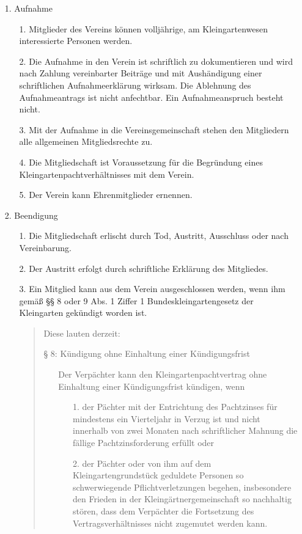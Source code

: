 \documentclass{scrartcl}
\begin{document}
\begin{itemize}
	\item[1.] Aufnahme
		\begin{itemize}
		\item[1.] Mitglieder des Vereins können volljährige, am Kleingartenwesen
		          interessierte Personen werden.
		\item[2.] Die Aufnahme in den Verein ist schriftlich zu dokumentieren und wird
				  nach Zahlung vereinbarter Beiträge und mit Aushändigung einer
				  schriftlichen Aufnahmeerklärung wirksam. Die Ablehnung des
				  Aufnahmeantrags ist nicht anfechtbar. Ein Aufnahmeanspruch besteht
				  nicht.
		\item[3.] Mit der Aufnahme in die Vereinsgemeinschaft stehen den Mitgliedern
		          alle allgemeinen Mitgliedsrechte zu.
		\item[4.] Die Mitgliedschaft ist Voraussetzung für die Begründung eines
				  Kleingartenpachtverhältnisses mit dem Verein.
		\item[5.] Der Verein kann Ehrenmitglieder ernennen.
		\end{itemize}
	\item[2.] Beendigung
		\begin{itemize}
		 	\item[1.] Die Mitgliedschaft erlischt durch Tod, Austritt, Ausschluss oder
		 			  nach Vereinbarung.
		 	\item[2.] Der Austritt erfolgt durch schriftliche Erklärung des Mitgliedes.
		 	\item[3.] Ein Mitglied kann aus dem Verein ausgeschlossen werden, wenn ihm
		 			  gemäß §§ 8 oder 9 Abs. 1 Ziffer 1 Bundeskleingartengesetz der
		 			  Kleingarten gekündigt worden ist.

		\begin{quote}
		Diese lauten derzeit:
		
				§ 8: Kündigung ohne Einhaltung einer Kündigungsfrist
					\begin{itemize}
						\item[] Der Verpächter kann den Kleingartenpachtvertrag ohne
						    	Einhaltung einer Kündigungsfrist kündigen, wenn
							\begin{itemize}
						 		\item[1.] der Pächter mit der Entrichtung des
						 		          Pachtzinses für mindestens ein Vierteljahr in
						 		          Verzug ist und nicht innerhalb von zwei
						 		          Monaten nach schriftlicher Mahnung die fällige
						 				  Pachtzinsforderung erfüllt oder
						 		\item[2.] der Pächter oder von ihm auf dem
						 				  Kleingartengrundstück geduldete Personen so
						 				  schwerwiegende Pflichtverletzungen begehen,
						 				  insbesondere den Frieden in der
						 				  Kleingärtnergemeinschaft so nachhaltig stören,
						 				  dass dem Verpächter die Fortsetzung des
						 				  Vertragsverhältnisses nicht zugemutet werden
						 				  kann.
							\end{itemize} 
						\end{itemize}


\end{quote}
\end{itemize}
\end{itemize}
\end{document}
